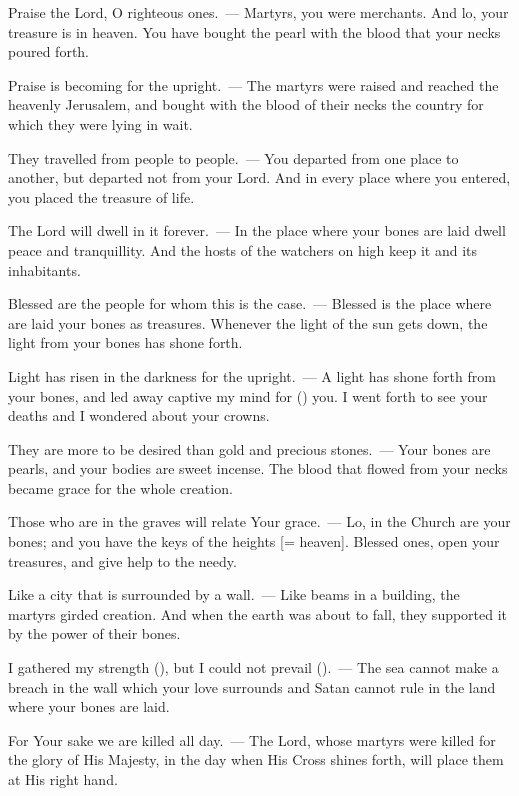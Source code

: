 \documentclass[12pt,twoside,a5paper]{article}
\begin{document}
\begin{halfparskip}
  Praise the Lord, O righteous ones.~--- Martyrs, you were merchants. And lo, your treasure is in heaven. You have bought the pearl with the blood that your necks poured forth.

  Praise is becoming for the upright.~--- The martyrs were raised and reached the heavenly Jerusalem, and bought with the blood of their necks the country for which they were lying in wait.

  They travelled from people to people.~--- You departed from one place to another, but departed not from your Lord. And in every place where you entered, you placed the treasure of life.

  The Lord will dwell in it forever.~--- In the place where your bones are laid dwell peace and tranquillity. And the hosts of the watchers on high keep it and its inhabitants.

  Blessed are the people for whom this is the case.~--- Blessed is the place where are laid your bones as treasures. Whenever the light of the sun gets down, the light from your bones has shone forth.

  Light has risen in the darkness for the upright.~--- A light has shone forth from your bones, and led away captive my mind for () you. I went forth to see your deaths and I wondered about your crowns.

  They are more to be desired than gold and precious stones.~--- Your bones are pearls, and your bodies are sweet incense. The blood that flowed from your necks became grace for the whole creation.

  Those who are in the graves will relate Your grace.~--- Lo, in the Church are your bones; and you have the keys of the heights [= heaven]. Blessed ones, open your treasures, and give help to the needy.

  Like a city that is surrounded by a wall.~--- Like beams in a building, the martyrs girded creation. And when the earth was about to fall, they supported it by the power of their bones.

  I gathered my strength (), but I could not prevail ().~--- The sea cannot make a breach in the wall which your love surrounds and Satan cannot rule in the land where your bones are laid.

  For Your sake we are killed all day.~--- The Lord, whose martyrs were killed for the glory of His Majesty, in the day when His Cross shines forth, will place them at His right hand.


\end{halfparskip}
\end{document}
